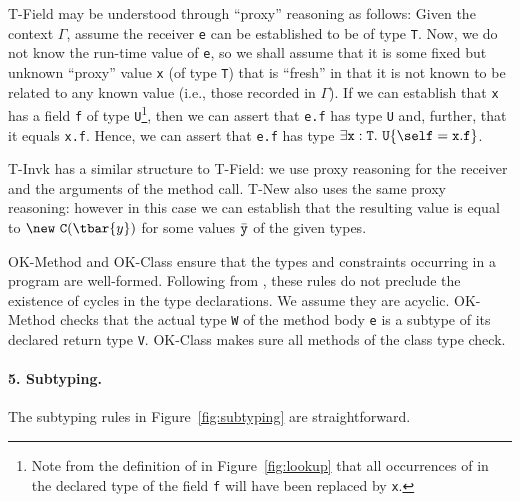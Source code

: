{\sc T-Field} may be understood through ``proxy'' reasoning as
follows:  Given the context $\Gamma$, assume the receiver {\tt e} can
be established to be of type {\tt T}. Now, we do not know the run-time
value of {\tt e}, so we shall assume that it is some fixed but unknown
``proxy'' value {\tt x} (of type {\tt T}) that is ``fresh'' in that it
is not known to be related to any known value (i.e., those recorded
in $\Gamma$).  If we can establish that {\tt x} has a field {\tt f} of
type {\tt U}\footnote{Note from the definition of
\fields{} in Figure~\ref{fig:lookup} that all occurrences of
\this{} in the declared type of the field {\tt f} will have been replaced
by {\tt x}.}, then we can assert that
{\tt e.f} has type {\tt U} and, further, that it equals {\tt x.f}.
Hence, we can assert that {\tt e.f} has type 
$\exists {\tt x}:{\tt T}.~{\tt U}\{\self={\tt x}.{\tt f}\}$.

{\sc T-Invk} has a similar structure to {\sc T-Field}: we use
proxy reasoning for the receiver and the arguments of the method
call. {\sc T-New} also uses the same proxy reasoning: however in this case
we can establish that the resulting value is equal to $\new~{\tt C}(\tbar{y})$
for some values $\bar{\tt y}$ of the given types.

{\sc OK-Method} and {\sc OK-Class} ensure that the types and constraints occurring in a program are well-formed. Following from \FJ{}, these rules do not preclude the existence of cycles in the type declarations. We assume they are acyclic. {\sc OK-Method} checks that the actual type {\tt W} of the method body {\tt e} is a subtype of its declared return type {\tt V}. {\sc OK-Class} makes sure all methods of the class type check.


\paragraph{5. Subtyping.} The subtyping rules in Figure~\ref{fig:subtyping} are straightforward.


